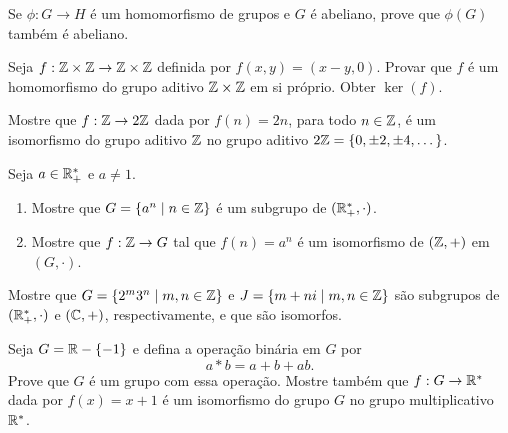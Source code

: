 \documentclass[12pt]{exam}
\begin{document}
    \questao{} Se $\phi : G \to H$ é um homomorfismo de grupos e $G$ é abeliano, prove que $\phi(G)$ também é abeliano.

    \vspace{.3cm}

    \questao{} Seja $f: \mathbb{Z} \times \mathbb{Z} \to \mathbb{Z} \times \mathbb{Z}$ definida por $f(x, y) = (x - y, 0)$. Provar que $f$ \'e um homomorfismo do grupo aditivo $\mathbb{Z} \times \mathbb{Z}$ em si pr\'oprio. Obter $\ker(f)$.

    \vspace{.3cm}

    \questao{} Mostre que $f : \mathbb{Z} \to 2\mathbb{Z}$ dada por $f(n) = 2n$, para todo $n \in \mathbb{Z}$, \'e um isomorfismo do grupo aditivo $\mathbb{Z}$ no grupo aditivo $2\mathbb{Z} = \{0, \pm 2, \pm 4, \dots\}$.

    \vspace{.3cm}

    \questao{} Seja $a \in \mathbb{R}_+^*$ e $a \ne 1$.
    \begin{enumerate}[label=({\alph*})]
      \item  Mostre que $G = \{a^n \mid n \in \mathbb{Z}\}$ \'e um subgrupo de $(\mathbb{R}_+^*, \cdot)$.

      \item Mostre que $f : \mathbb{Z} \to G$ tal que $f(n) = a^n$ \'e um isomorfismo de $(\mathbb{Z}, +)$ em $(G, \cdot)$.
    \end{enumerate}

    \vspace{.3cm}

    \questao{} Mostre que $G = \{2^m3^n \mid m, n \in \mathbb{Z}\}$ e $J = \{m + ni \mid m, n \in \mathbb{Z}\}$ s\~ao subgrupos de $(\mathbb{R}_+^*, \cdot)$ e $(\mathbb{C}, +)$, respectivamente, e que s\~ao isomorfos.

    \vspace{.3cm}

    \questao{} Seja $G = \mathbb{R} - \{-1\}$ e defina a operação binária em $G$ por
    \[
        a * b = a + b + ab.
    \]
    Prove que $G$ é um grupo com essa operação. Mostre também que $f : G \to \mathbb{R}^*$ dada por $f(x) = x + 1$ é um isomorfismo do grupo $G$ no grupo multiplicativo $\mathbb{R}^*$.
\end{document}
